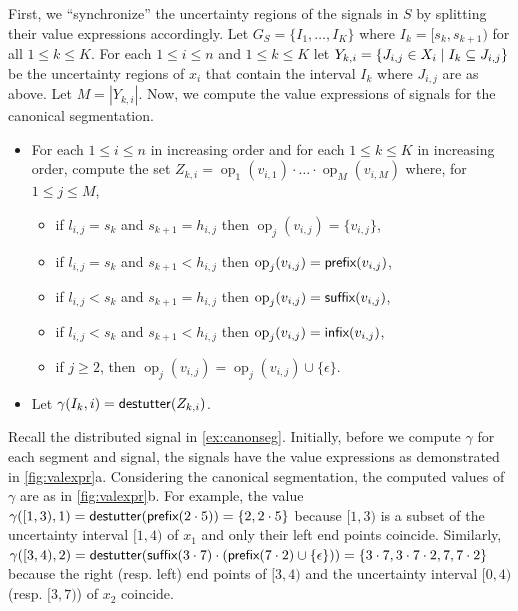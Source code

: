 First,  we ``synchronize'' the uncertainty regions of the signals in $S$ by splitting their value expressions accordingly.
Let $G_S = \{I_1, \ldots, I_K\}$ where $I_k = [s_k, s_{k+1})$ for all $1 \leq k \leq K$.
For each $1 \leq i \leq n$ and $1 \leq k \leq K$ let $Y_{k,i} = \{ J_{i,j} \in X_i \st I_k \subseteq J_{i,j}\}$ be the uncertainty regions of $x_i$ that contain the interval $I_k$ where $J_{i,j}$ are as above.
Let $M = |Y_{k,i}|$.
Now, we compute the value expressions of signals for the canonical segmentation. 
\begin{itemize}
	\item For each $1 \leq i \leq n$ in increasing order and for each $1 \leq k \leq K$ in increasing order, compute the set $Z_{k,i} = \operatorname{op}_1(v_{i,1}) \cdot \ldots \cdot \operatorname{op}_{M}(v_{i,M})$ where, for $1 \leq j \leq M$,
	\begin{itemize}
		\item if $l_{i,j} = s_k$ and $s_{k+1} = h_{i,j}$ then $\operatorname{op}_j(v_{i,j}) = \{v_{i,j}\}$,
		\item if $l_{i,j} = s_k$ and $s_{k+1} < h_{i,j}$ then $\operatorname{op}_j(v_{i,j}) = \textsf{prefix}(v_{i,j})$,
		\item if $l_{i,j} < s_k$ and $s_{k+1} = h_{i,j}$ then $\operatorname{op}_j(v_{i,j}) = \textsf{suffix}(v_{i,j})$,
		\item if $l_{i,j} < s_k$ and $s_{k+1} < h_{i,j}$ then $\operatorname{op}_j(v_{i,j}) = \textsf{infix}(v_{i,j})$,
		\item if $j \geq 2$, then $\operatorname{op}_j(v_{i,j}) = \operatorname{op}_j(v_{i,j}) \cup \{\epsilon\}$.
	\end{itemize}
	\item Let $\gamma(I_k, i) = \mathsf{destutter}(Z_{k,i})$.
\end{itemize}

\begin{example}
	Recall the distributed signal in \cref{ex:canonseg}.
	Initially, before we compute $\gamma$ for each segment and signal, the signals have the value expressions as demonstrated in \cref{fig:valexpr}a.
	Considering the canonical segmentation, the computed values of $\gamma$ are as in \cref{fig:valexpr}b.
	For example, the value $\gamma([1,3),1) = \mathsf{destutter}(\textsf{prefix}(2 \cdot 5)) = \{2, 2 \cdot 5\}$ because $[1,3)$ is a subset of the uncertainty interval $[1,4)$ of $x_1$ and only their left end points coincide.
	Similarly, $\gamma([3,4),2) = \mathsf{destutter}(\textsf{suffix}(3 \cdot 7) \cdot (\textsf{prefix}(7 \cdot 2) \cup \{\epsilon\})) = \{3 \cdot 7, 3 \cdot 7 \cdot 2, 7, 7 \cdot 2\}$ because the right (resp. left) end points of $[3,4)$ and the uncertainty interval $[0,4)$ (resp. $[3,7)$) of $x_2$ coincide.
\end{example}

